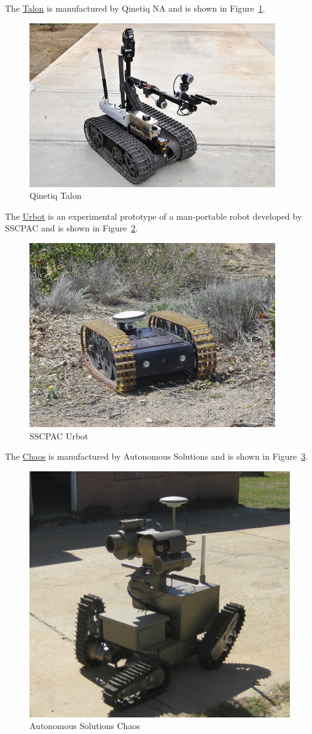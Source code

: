 The \href{http://www.foster-miller.com/lemming.htm}{Talon} is manufactured by Qinetiq NA and is shown in Figure~\ref{fig:talon}.

\begin{figure}[ht!]
\centering
\includegraphics[width=.3\textwidth]{images/talonRetrotraverse}
\caption{Qinetiq Talon}%
\label{fig:talon}
\end{figure}

The \href{http://www.spawar.navy.mil/robots/land/mprs/mprs.html}{Urbot} is an experimental prototype of a man-portable robot developed by SSCPAC and is shown in Figure~\ref{fig:urbot}.

\begin{figure}[ht!]
\centering
\includegraphics[width=.3\textwidth]{images/urbotWithGps}
\caption{SSCPAC Urbot}%
\label{fig:urbot}
\end{figure}

The \href{http://www.autonomoussolutions.com/products/chaos.php}{Chaos} is manufactured by Autonomous Solutions and is shown in Figure~\ref{fig:chaos}.

\begin{figure}[ht!]
\centering
\includegraphics[width=.3\textwidth]{images/chaos}
\caption{Autonomous Solutions Chaos}%
\label{fig:chaos}
\end{figure}

